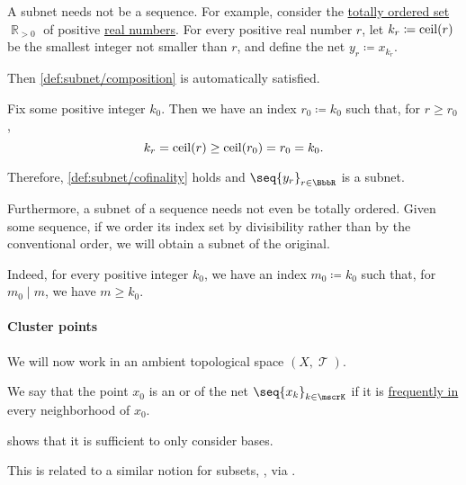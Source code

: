 \begin{example}
\begin{thmenum}
    A subnet needs not be a sequence. For example, consider the \hyperref[def:totally_ordered_set]{totally ordered set} \( \BbbR_{>0} \) of positive \hyperref[def:real_numbers]{real numbers}. For every positive real number \( r \), let \( k_r \coloneqq \operatorname{ceil}(r) \) be the smallest integer not smaller than \( r \), and define the net \( y_r \coloneqq x_{k_r} \).

    Then \ref{def:subnet/composition} is automatically satisfied.

    Fix some positive integer \( k_0 \). Then we have an index \( r_0 \coloneqq k_0 \) such that, for \( r \geq r_0 \),
    \begin{equation*}
      k_r = \operatorname{ceil}(r) \geq \operatorname{ceil}(r_0) = r_0 = k_0.
    \end{equation*}

    Therefore, \ref{def:subnet/cofinality} holds and \( \seq{ y_r }_{r \in \BbbR} \) is a subnet.

     Furthermore, a subnet of a sequence needs not even be totally ordered. Given some sequence, if we order its index set by divisibility rather than by the conventional order, we will obtain a subnet of the original.

    Indeed, for every positive integer \( k_0 \), we have an index \( m_0 \coloneqq k_0 \) such that, for \( m_0 \mid m \), we have \( m \geq k_0 \).
  \end{thmenum}
\end{example}

\paragraph{Cluster points}

We will now work in an ambient topological space \( (X, \mscrT) \).

\begin{definition}\label{def:net_cluster_point}
  We say that the point \( x_0 \) is an  or  of the net \( \seq{ x_k }_{k \in \mscrK} \) if it is \hyperref[def:net_frequently_in]{frequently in} every neighborhood of \( x_0 \).
\end{definition}
\begin{comments}
  \item {} shows that it is sufficient to only consider bases.
  \item This is related to a similar notion for subsets, , via .
\end{comments}

